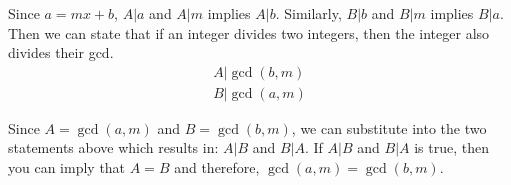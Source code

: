 \documentclass[11pt]{article}
\begin{document}
Since $a = mx + b$, $A|a$ and $A|m$ implies $A|b$. Similarly, $B|b$ and $B|m$ implies $B|a$. Then we can state that if an integer divides two integers, then the integer also divides their gcd.
\begin{align*}
    A|\gcd(b,m)\\
    B|\gcd(a,m)
\end{align*}

Since $A = \gcd(a, m)$ and $B = \gcd(b,m)$, we can substitute into the two statements above which results in: $A|B$ and $B|A$. If $A|B$ and $B|A$ is true, then you can imply that $A = B$ and therefore, $\gcd(a,m) = \gcd(b,m)$.
\end{document}
